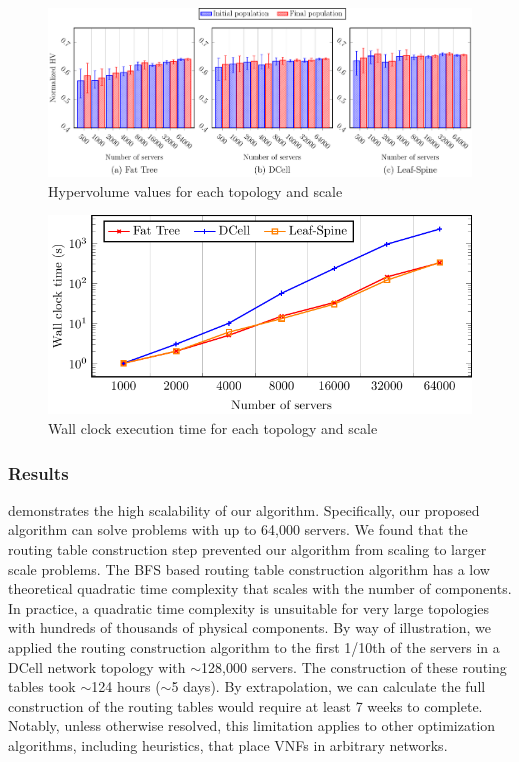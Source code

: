 \begin{figure}[t]
    \includegraphics[width=\linewidth]{figures/graphs/large_scale/large_scale_hv}
    \caption{Hypervolume values for each topology and scale}
    \label{fig:large_hv}
\end{figure}
\begin{figure}[t]
    \includegraphics[width=\linewidth]{figures/graphs/large_scale/large_scale_times}
    \caption{Wall clock execution time for each topology and scale}
    \label{fig:large_times}
\end{figure}

\subsubsection{Results}
 demonstrates the high scalability of our algorithm. Specifically, our proposed algorithm can solve problems with up to 64,000 servers. We found that the routing table construction step prevented our algorithm from scaling to larger scale problems. The BFS based routing table construction algorithm has a low theoretical quadratic time complexity that scales with the number of components. In practice, a quadratic time complexity is unsuitable for very large topologies with hundreds of thousands of physical components. By way of illustration, we applied the routing construction algorithm to the first 1/10th of the servers in a DCell network topology with $\sim$128,000 servers. The construction of these routing tables took $\sim$124 hours ($\sim$5 days). By extrapolation, we can calculate the full construction of the routing tables would require at least 7 weeks to complete. Notably, unless otherwise resolved, this limitation applies to other optimization algorithms, including heuristics, that place VNFs in arbitrary networks.

